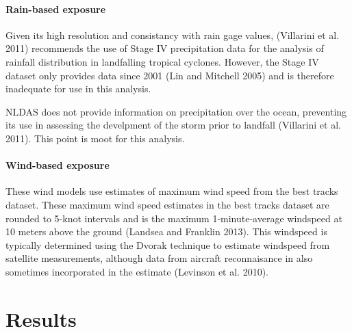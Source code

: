 \documentclass[]{elsarticle} %
\begin{document}
\paragraph{Rain-based exposure}\label{rain-based-exposure}

Given its high resolution and consistancy with rain gage values,
(Villarini et al. 2011) recommends the use of Stage IV precipitation
data for the analysis of rainfall distribution in landfalling tropical
cyclones. However, the Stage IV dataset only provides data since 2001
(Lin and Mitchell 2005) and is therefore inadequate for use in this
analysis.

NLDAS does not provide information on precipitation over the ocean,
preventing its use in assessing the develpment of the storm prior to
landfall (Villarini et al. 2011). This point is moot for this analysis.

\paragraph{Wind-based exposure}\label{wind-based-exposure}

These wind models use estimates of maximum wind speed from the best
tracks dataset. These maximum wind speed estimates in the best tracks
dataset are rounded to 5-knot intervals and is the maximum
1-minute-average windspeed at 10 meters above the ground (Landsea and
Franklin 2013). This windspeed is typically determined using the Dvorak
technique to estimate windspeed from satellite measurements, although
data from aircraft reconnaisance in also sometimes incorporated in the
estimate (Levinson et al. 2010).

\section{Results}\label{results}
\end{document}
